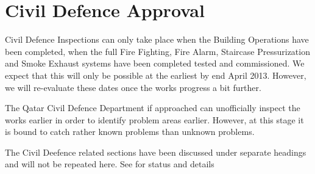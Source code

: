 \chapter{Civil Defence Approval}

Civil Defence Inspections can only take place when the Building Operations have been completed, when the full Fire Fighting,  Fire Alarm, Staircase Pressurization and Smoke Exhaust systems have been completed tested and commissioned. We expect that this will only be possible at the earliest by end April  2013. However, we will re-evaluate these dates once the works progress a bit further. 


The Qatar Civil Defence Department if approached can unofficially inspect the works earlier in order to identify problem areas earlier. However, at this stage it is bound to catch rather known problems than unknown problems.

The Civil Deefence related sections have been discussed under separate headings and will not be repeated here. See  for status and details

